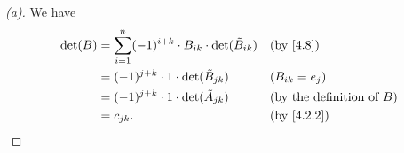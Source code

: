 \begin{proof}[(a)]
  We have
  \begin{align*}
    \det(B) & = \sum_{i = 1}^n (-1)^{i + k} \cdot B_{i k} \cdot \det(\tilde{B}_{i k}) &  & \by{4.8}                            \\
            & = (-1)^{j + k} \cdot 1 \cdot \det(\tilde{B}_{j k})                      &  & (B_{i k} = e_j)                     \\
            & = (-1)^{j + k} \cdot 1 \cdot \det(\tilde{A}_{j k})                      &  & \text{(by the definition of \(B\))} \\
            & = c_{j k}.                                                              &  & \by{4.2.2}
  \end{align*}
\end{proof}

